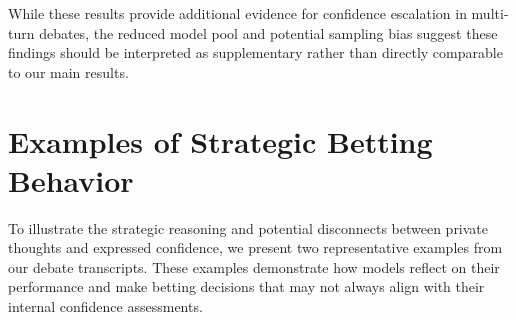 \documentclass{article}
\begin{document}
While these results provide additional evidence for confidence escalation in multi-turn debates, the reduced model pool and potential sampling bias suggest these findings should be interpreted as supplementary rather than directly comparable to our main results.

\section{Examples of Strategic Betting Behavior}
\label{appendix:strategic_betting_examples}

To illustrate the strategic reasoning and potential disconnects between private thoughts and expressed confidence, we present two representative examples from our debate transcripts. These examples demonstrate how models reflect on their performance and make betting decisions that may not always align with their internal confidence assessments.
\end{document}
